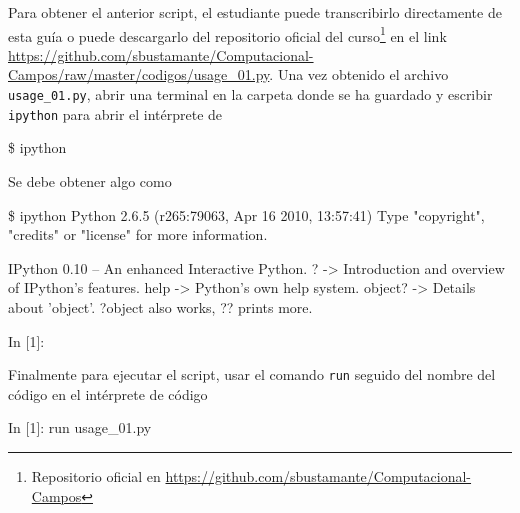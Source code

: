 Para obtener el anterior script, el estudiante puede transcribirlo 
directamente de esta guía o puede descargarlo del repositorio oficial del 
curso\footnote{Repositorio oficial en 
\url{https://github.com/sbustamante/Computacional-Campos}} en el link
\url{https://github.com/sbustamante/Computacional-Campos/raw/master/codigos/usage\_01.py}.
Una vez obtenido el archivo \texttt{usage\_01.py}, abrir una terminal en la 
carpeta donde se ha guardado y escribir \texttt{ipython} para abrir el 
intérprete de \python


\begin{listing}[style=consola, numbers=none]
\$ ipython
\end{listing}


Se debe obtener algo como


\begin{listing}[style=consola, numbers=none]
\$ ipython
Python 2.6.5 (r265:79063, Apr 16 2010, 13:57:41) 
Type "copyright", "credits" or "license" for more information.

IPython 0.10 -- An enhanced Interactive Python.
?         -> Introduction and overview of IPython's features.
help      -> Python's own help system.
object?   -> Details about 'object'. ?object also works, ?? prints more.

In [1]: 
\end{listing}


Finalmente para ejecutar el script, usar el comando \texttt{run} seguido
del nombre del código en el intérprete de código \python


\begin{listing}[style=consola, numbers=none]
In [1]: run usage_01.py
\end{listing}




